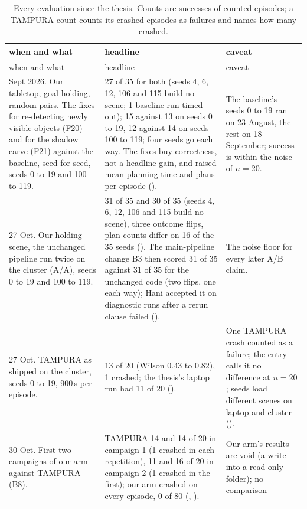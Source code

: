 \begin{small}
\begin{longtable}{@{}P{0.30\textwidth}P{0.36\textwidth}P{0.28\textwidth}@{}}
\caption[Every evaluation since the thesis.]{Every evaluation since the thesis. Counts are successes of counted
episodes; a TAMPURA count counts its crashed episodes as failures and names
how many crashed. }\label{tab:catalogue}\\
\toprule
when and what & headline & caveat \\
\midrule
\endfirsthead
\toprule
when and what & headline & caveat \\
\midrule
\endhead
\bottomrule
{} Sept 2026. Our tabletop, goal holding, random pairs. The fixes for re-detecting
newly visible objects (F20) and for the shadow carve (F21) against the baseline,
seed for seed, seeds 0 to 19 and 100 to 119. &
27 of 35 for both (seeds 4, 6, 12, 106 and 115 build no scene; 1 baseline run timed
out); 15 against 13 on seeds 0 to 19, 12 against 14 on seeds 100 to 119; four seeds
go each way. The fixes buy correctness, not a headline gain, and raised mean planning
time and plans per episode (). &
The baseline's seeds 0 to 19 ran on 23 August, the rest on 18 September; success is
within the noise of $n = 20$. \\
27 Oct. Our holding scene, the unchanged pipeline run twice on the cluster (A/A),
seeds 0 to 19 and 100 to 119. &
31 of 35 and 30 of 35 (seeds 4, 6, 12, 106 and 115 build no scene), three outcome
flips, plan counts differ on 16 of the 35 seeds (). The main-pipeline change B3
then scored 31 of 35 against 31 of 35 for the unchanged code (two flips, one each way);
Hani accepted it on diagnostic runs after a rerun clause failed (). &
The noise floor for every later A/B claim. \\
27 Oct. TAMPURA as shipped on the cluster, seeds 0 to 19, 900\,s per episode. &
13 of 20 (Wilson 0.43 to 0.82), 1 crashed; the thesis's laptop run had 11 of 20
(). &
One TAMPURA crash counted as a failure; the entry calls it no difference at
$n = 20$; seeds load different scenes on laptop and cluster (). \\
30 Oct. First two campaigns of our arm against TAMPURA (B8). &
TAMPURA 14 and 14 of 20 in campaign 1 (1 crashed in each repetition), 11 and 16 of 20
in campaign 2 (1 crashed in the first); our arm crashed on every episode, 0 of 80
(, ). &
Our arm's results are void (a write into a read-only folder); no comparison

\end{longtable}
\end{small}
